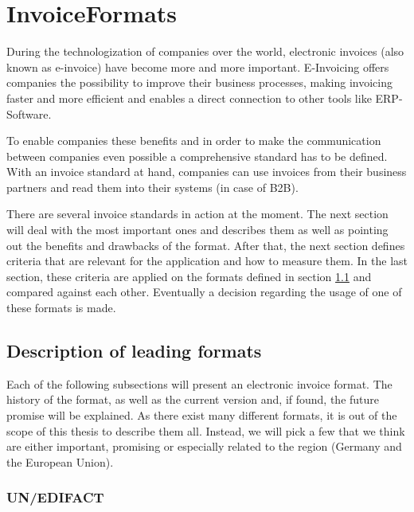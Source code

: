 %
% 
\chapter{InvoiceFormats}
\label{Electronic invoice formats - A comparison}

During the technologization of companies over the world, electronic invoices (also known as e-invoice) have become more and more important. E-Invoicing offers companies the possibility to improve their business processes, making invoicing faster and more efficient and enables a direct connection to other tools like ERP-Software. 

To enable companies these benefits and in order to make the communication between companies even possible a comprehensive standard has to be defined. With an invoice standard at hand, companies can use invoices from their business partners and read them into their systems (in case of B2B). 

There are several invoice standards in action at the moment. The next section will deal with the most important ones and describes them as well as pointing out the benefits and drawbacks of the format.
After that, the next section defines criteria that are relevant for the application and how to measure them.
In the last section, these criteria are applied on the formats defined in section \ref{sec2.1} and compared against each other. Eventually a decision regarding the usage of one of these formats is made.

\section{Description of leading formats}
\label{sec2.1}

Each of the following subsections will present an electronic invoice format. The history of the format, as well as the current version and, if found, the future promise will be explained. As there exist many different formats, it is out of the scope of this thesis to describe them all. Instead, we will pick a few that we think are either important, promising or especially related to the region (Germany and the European Union).

\subsection{UN/EDIFACT}
\label{sec2.1.1}

